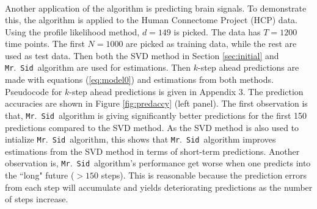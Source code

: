 \documentclass[fleqn]{article}
\let\oldref\ref
\renewcommand{\ref}[1]{(\oldref{#1})}
\newcommand{\mrsid}{{\sc \texttt{Mr}.~\texttt{Sid}}}
\begin{document}
\begin{center}
\[\begin{array}{lll}
\end{array}
\]
\label{fig:3d}
\end{center}

Another application of the algorithm is predicting brain signals. To demonstrate this, the algorithm is applied to the Human Connectome Project (HCP) data.
% 
Using the profile likelihood method, $d=149$ is picked. The data has $T=1200$ time points. The first $N = 1000$ are picked as training data, while the rest are used as test data. Then both the SVD method in Section \oldref{sec:initial} and \mrsid~algorithm are used for estimations. Then $k$-step ahead predictions are made with equations \ref{eq:model0} and estimations from both methods. Pseudocode for $k$-step ahead predictions is given in Appendix 3. The prediction accuracies are shown in Figure \oldref{fig:predaccy} (left panel). The first observation is that, \mrsid~algorithm is giving significantly better predictions for the first 150 predictions compared to the SVD method. As the SVD method is also used to intialize \mrsid~algorithm, this shows that \mrsid~algorithm improves estimations from the SVD method in terms of short-term predictions. Another observation is, \mrsid~algorithm's performance get worse when one predicts into the ``long" future ($>150$ steps). This is reasonable because the prediction errors from each step will accumulate and yields deteriorating predictions as the number of steps increase.
\end{document}
